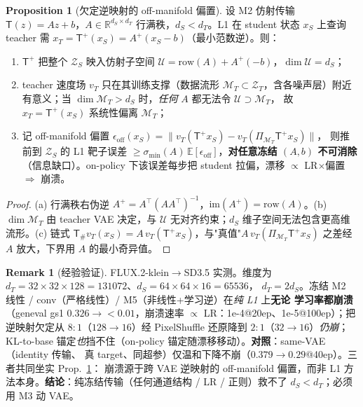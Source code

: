 \documentclass[11pt,a4paper]{article}
\newcommand{\E}{\mathbb{E}}
\newcommand{\R}{\mathbb{R}}
\newcommand{\Zt}{\mathcal{Z}_T}
\newcommand{\Zs}{\mathcal{Z}_S}
\newcommand{\Tmap}{\mathsf{T}}
\newcommand{\push}{\#}
\newcommand{\vT}{v_{T}}
\theoremstyle{definition}
\newtheorem{remark}{Remark}
\newtheorem{proposition}{Proposition}
\begin{document}
\begin{proposition}[欠定逆映射的 off-manifold 偏置]
\label{prop:inverse-deficit}
设 M2 仿射传输 $\Tmap(z)=Az+b$，$A\in\R^{d_S\times d_T}$ 行满秩，$d_S<d_T$。L1 在 student 状态
$x_S$ 上查询 teacher 需 $x_T=\Tmap^{+}(x_S)=A^{+}(x_S-b)$（最小范数逆）。则：
\begin{enumerate}[leftmargin=1.6em,label=(\alph*)]
\item $\Tmap^{+}$ 把整个 $\Zs$ 映入仿射子空间 $\mathcal{U}=\mathrm{row}(A)+A^{+}(-b)$，$\dim\mathcal{U}=d_S$；
\item teacher 速度场 $\vT$ 只在其训练支撑（数据流形 $\mathcal{M}_T\subset\Zt$，含各噪声层）附近
有意义；当 $\dim\mathcal{M}_T>d_S$ 时，\emph{任何} $A$ 都无法令 $\mathcal{U}\supset\mathcal{M}_T$，
故 $x_T=\Tmap^{+}(x_S)$ 系统性偏离 $\mathcal{M}_T$；
\item 记 off-manifold 偏置 $\epsilon_{\mathrm{off}}(x_S)=\lVert \vT(\Tmap^{+}x_S)-\vT(\Pi_{\mathcal{M}_T}\Tmap^{+}x_S)\rVert$，
则推前到 $\Zs$ 的 L1 靶子误差 $\ge \sigma_{\min}(A)\,\E[\epsilon_{\mathrm{off}}]$，\textbf{对任意冻结
$(A,b)$ 不可消除}（信息缺口）。on-policy 下该误差每步把 student 拉偏，漂移 $\propto$ LR$\times$偏置
$\Rightarrow$ 崩溃。
\end{enumerate}
\end{proposition}
\begin{proof}
(a) 行满秩右伪逆 $A^{+}=A^\top(AA^\top)^{-1}$，$\mathrm{im}(A^{+})=\mathrm{row}(A)$。(b) $\dim\mathcal{M}_T$
由 teacher VAE 决定，与 $\mathcal{U}$ 无对齐约束；$d_S$ 维子空间无法包含更高维流形。(c) 链式
$\Tmap_\push\vT(x_S)=A\,\vT(\Tmap^{+}x_S)$，与"真值"$A\,\vT(\Pi_{\mathcal{M}_T}\Tmap^{+}x_S)$ 之差经
$A$ 放大，下界用 $A$ 的最小奇异值。\end{proof}

\begin{remark}[经验验证]
\label{rem:collapse-empirical}
FLUX.2-klein$\to$SD3.5 实测。维度为
$d_T{=}32{\times}32{\times}128{=}131072$、$d_S{=}64{\times}64{\times}16{=}65536$，
$d_T{=}2d_S$。冻结 M2 线性 / conv（严格线性）/ M5（非线性+学习逆）在\emph{纯 L1} 上\textbf{无论
学习率都崩溃}（geneval gs1 $0.326\!\to\!{<}0.01$，崩溃速率 $\propto$ LR：1e-4@20ep、1e-5@100ep）；把
逆映射欠定从 $8{:}1$（$128{\to}16$）经 PixelShuffle 还原降到 $2{:}1$（$32{\to}16$）\emph{仍崩}；
KL-to-base 锚定\emph{也}挡不住（on-policy 锚定随漂移移动）。\textbf{对照}：same-VAE（identity 传输、
真 target、同超参）仅温和下降不崩（$0.379\!\to\!0.29$@40ep）。三者共同坐实 Prop.~\ref{prop:inverse-deficit}：
崩溃源于跨 VAE 逆映射的 off-manifold 偏置，而非 L1 方法本身。\textbf{结论}：纯冻结传输（任何通道结构 /
LR / 正则）救不了 $d_S<d_T$；必须用 M3 动 VAE。
\end{remark}
\end{document}
